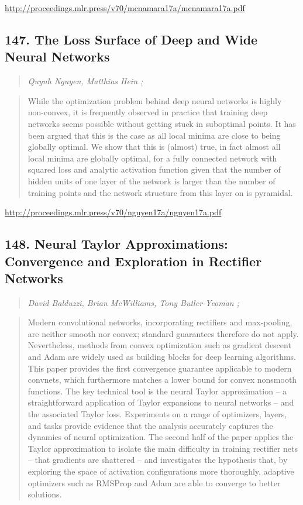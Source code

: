 \documentclass{article}
\begin{document}
\href{http://proceedings.mlr.press/v70/mcnamara17a/mcnamara17a.pdf}{http://proceedings.mlr.press/v70/mcnamara17a/mcnamara17a.pdf}

\subsection{147. The Loss Surface of Deep and Wide Neural Networks}

\begin{quote}
\footnotesize{\textit{Quynh Nguyen, Matthias Hein ;}}
\end{quote}

\begin{quote}
    While the optimization problem behind deep neural networks is highly non-convex, it is frequently observed in practice that training deep networks seems possible without getting stuck in suboptimal points. It has been argued that this is the case as all local minima are close to being globally optimal. We show that this is (almost) true, in fact almost all local minima are globally optimal, for a fully connected network with squared loss and analytic activation function given that the number of hidden units of one layer of the network is larger than the number of training points and the network structure from this layer on is pyramidal.  \end{quote}

\href{http://proceedings.mlr.press/v70/nguyen17a/nguyen17a.pdf}{http://proceedings.mlr.press/v70/nguyen17a/nguyen17a.pdf}

\subsection{148. Neural Taylor Approximations: Convergence and Exploration in Rectifier Networks}

\begin{quote}
\footnotesize{\textit{David Balduzzi, Brian McWilliams, Tony Butler-Yeoman ;}}
\end{quote}

\begin{quote}
    Modern convolutional networks, incorporating rectifiers and max-pooling, are neither smooth nor convex; standard guarantees therefore do not apply. Nevertheless, methods from convex optimization such as gradient descent and Adam are widely used as building blocks for deep learning algorithms. This paper provides the first convergence guarantee applicable to modern convnets, which furthermore matches a lower bound for convex nonsmooth functions. The key technical tool is the neural Taylor approximation – a straightforward application of Taylor expansions to neural networks – and the associated Taylor loss. Experiments on a range of optimizers, layers, and tasks provide evidence that the analysis accurately captures the dynamics of neural optimization. The second half of the paper applies the Taylor approximation to isolate the main difficulty in training rectifier nets – that gradients are shattered – and investigates the hypothesis that, by exploring the space of activation configurations more thoroughly, adaptive optimizers such as RMSProp and Adam are able to converge to better solutions.  \end{quote}
\end{document}
